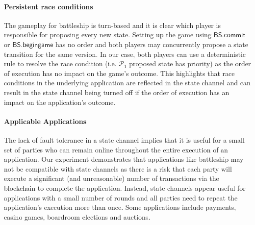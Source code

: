 \documentclass{llncs}
\newcommand{\participant}{\mathcal{P}}
\newcommand{\battleshipbegin}{\mathsf{BS.begingame}}
\newcommand{\battleshipcommit}{\mathsf{BS.commit}}
\begin{document}
\paragraph{Persistent race conditions} 
The gameplay for battleship is turn-based and it is clear which player is responsible for proposing every new state. 
Setting up the game using $\battleshipcommit$ or $\battleshipbegin$ has no order and both players may concurrently propose a state transition for the same version. 
In our case, both players can use a deterministic rule to resolve the race condition (i.e. $\participant_{1}$ proposed state has priority) as the order of execution has no impact on the game's outcome. 
This highlights that race conditions in the underlying application are reflected in the state channel and can result in the state channel being turned off if the order of execution has an impact on the application's outcome. 
%

\paragraph{Applicable Applications} 
The lack of fault tolerance in a state channel implies that it is useful for a small set of parties who can remain online throughout the entire execution of an application. 
Our experiment demonstrates that applications like battleship may not be compatible with state channels as there is a risk that each party will execute a significant (and unreasonable) number of transactions via the blockchain to complete the application.
Instead, state channels appear useful for applications  with a small number of rounds and all parties need to repeat the application's execution more than once. 
Some applications include payments, casino games, boardroom elections and auctions.
\end{document}
